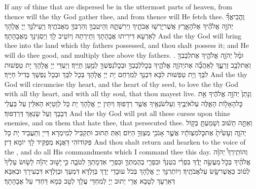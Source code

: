 {If any of thine that are dispersed be in the uttermost parts of heaven, from thence will the \lord\space thy God gather thee, and from thence will He fetch thee.}{}
{וֶהֱבִיאֲךָ֞ יְהֹוָ֣ה אֱלֹהֶ֗יךָ אֶל\maqqaf הָאָ֛רֶץ אֲשֶׁר\maqqaf יָרְשׁ֥וּ אֲבֹתֶ֖יךָ וִֽירִשְׁתָּ֑הּ וְהֵיטִֽבְךָ֥ וְהִרְבְּךָ֖ מֵאֲבֹתֶֽיךָ׃}
{וְיַעֵילִנָּךְ יְיָ אֱלָהָךְ לְאַרְעָא דִּירִיתוּ אֲבָהָתָךְ וְתֵירְתַהּ וְיוֹטֵיב לָךְ וְיַסְגֵּינָךְ מֵאֲבָהָתָךְ׃}
{And the \lord\space thy God will bring thee into the land which thy fathers possessed, and thou shalt possess it; and He will do thee good, and multiply thee above thy fathers. .}{}
{וּמָ֨ל יְהֹוָ֧ה אֱלֹהֶ֛יךָ אֶת\maqqaf לְבָבְךָ֖ וְאֶת\maqqaf לְבַ֣ב זַרְעֶ֑ךָ לְאַהֲבָ֞ה אֶת\maqqaf יְהֹוָ֧ה אֱלֹהֶ֛יךָ בְּכׇל\maqqaf לְבָבְךָ֥ וּבְכׇל\maqqaf נַפְשְׁךָ֖ לְמַ֥עַן חַיֶּֽיךָ׃}
{וְיַעְדֵּי יְיָ אֱלָהָךְ יָת טַפְשׁוּת לִבָּךְ וְיָת טַפְשׁוּת לִבָּא דִּבְנָךְ לְמִרְחַם יָת יְיָ אֱלָהָךְ בְּכָל לִבָּךְ וּבְכָל נַפְשָׁךְ בְּדִיל חַיָּיךְ׃}
{And the \lord\space thy God will circumcise thy heart, and the heart of thy seed, to love the \lord\space thy God with all thy heart, and with all thy soul, that thou mayest live.}{}
{וְנָתַן֙ יְהֹוָ֣ה אֱלֹהֶ֔יךָ אֵ֥ת כׇּל\maqqaf הָאָל֖וֹת הָאֵ֑לֶּה עַל\maqqaf אֹיְבֶ֥יךָ וְעַל\maqqaf שֹׂנְאֶ֖יךָ אֲשֶׁ֥ר רְדָפֽוּךָ׃}
{וְיִתֵּין יְיָ אֱלָהָךְ יָת כָּל לְוָטַיָּא הָאִלֵּין עַל בַּעֲלֵי דְּבָבָךְ וְעַל שָׂנְאָךְ דְּרַדְפוּךְ׃}
{And the \lord\space thy God will put all these curses upon thine enemies, and on them that hate thee, that persecuted thee.}{}
{וְאַתָּ֣ה תָשׁ֔וּב וְשָׁמַעְתָּ֖ בְּק֣וֹל יְהֹוָ֑ה וְעָשִׂ֙יתָ֙ אֶת\maqqaf כׇּל\maqqaf מִצְוֺתָ֔יו אֲשֶׁ֛ר אָנֹכִ֥י מְצַוְּךָ֖ הַיּֽוֹם׃}
{וְאַתְּ תְּתוּב וּתְקַבֵּיל לְמֵימְרָא דַּייָ וְתַעֲבֵיד יָת כָּל פִּקּוֹדוֹהִי דַּאֲנָא מְפַקֵּיד לָךְ יוֹמָא דֵין׃}
{And thou shalt return and hearken to the voice of the \lord, and do all His commandments which I command thee this day.}{}
{וְהוֹתִֽירְךָ֩ יְהֹוָ֨ה אֱלֹהֶ֜יךָ בְּכֹ֣ל \legarmeh  מַעֲשֵׂ֣ה יָדֶ֗ךָ בִּפְרִ֨י בִטְנְךָ֜ וּבִפְרִ֧י בְהֶמְתְּךָ֛ וּבִפְרִ֥י אַדְמָתְךָ֖ לְטֹבָ֑ה כִּ֣י \legarmeh  יָשׁ֣וּב יְהֹוָ֗ה לָשׂ֤וּשׂ עָלֶ֙יךָ֙ לְט֔וֹב כַּאֲשֶׁר\maqqaf שָׂ֖שׂ עַל\maqqaf אֲבֹתֶֽיךָ׃}
{וְיוֹתְרִנָּךְ יְיָ אֱלָהָךְ בְּכֹל עוּבָדֵי יְדָךְ בְּוַלְדָּא דִּמְעָךְ וּבְוַלְדָּא דִּבְעִירָךְ וּבְאִבָּא דְּאַרְעָךְ לְטָבָא אֲרֵי יְתוּב יְיָ לְמִחְדֵּי עֲלָךְ לְטָב כְּמָא דַּחְדִּי עַל אֲבָהָתָךְ׃}
